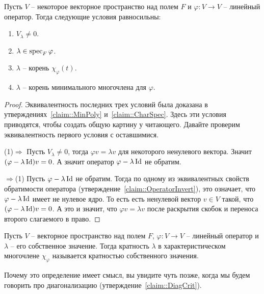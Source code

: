 \begin{claim}
\label{claim::EigenSpec}
Пусть $V$ -- некоторое векторное пространство над полем $F$ и $\varphi \colon V\to V$ -- линейный оператор.
Тогда следующие условия равносильны:
\begin{enumerate}
\item $V_\lambda \neq 0$.

\item $\lambda \in \operatorname{spec}_F\varphi$.

\item $\lambda$ -- корень $\chi_\varphi(t)$.

\item $\lambda$ -- корень минимального многочлена для $\varphi$.
\end{enumerate}
\end{claim}
\begin{proof}
Эквивалентность последних трех условий была доказана в утверждениях~\ref{claim::MinPoly} и~\ref{claim::CharSpec}.
Здесь эти условия приводятся, чтобы создать общую картину у читающего.
Давайте проверим эквивалентность первого условия с оставшимися.

(1)$\Rightarrow$ Пусть $V_\lambda \neq 0$, тогда $\varphi v = \lambda v$ для некоторого ненулевого вектора.
Значит $(\varphi - \lambda \operatorname{Id})v = 0$.
А значит оператор $\varphi - \lambda \operatorname{Id}$ не обратим.

$\Rightarrow$(1) Пусть $\varphi -\lambda \operatorname{Id}$ не обратим.
Тогда по одному из эквивалентных свойств обратимости оператора (утверждение~\ref{claim::OperatorInvert}), это означает, что $\varphi - \lambda \operatorname{Id}$ имеет не нулевое ядро.
То есть есть ненулевой вектор $v\in V$ такой, что $(\varphi - \lambda \operatorname{Id})v = 0$.
А это и значит, что $\varphi v = \lambda v$ после раскрытия скобок и переноса второго слагаемого в право.
\end{proof}

\begin{definition}
Пусть $V$ -- векторное пространство над полем $F$, $\varphi\colon V\to V$ -- линейный оператор и $\lambda$ -- его собственное значение.
Тогда кратность $\lambda$ в характеристическом многочлене $\chi_\varphi$ называется кратностью собственного значения.
\end{definition}

Почему это определение имеет смысл, вы увидите чуть позже, когда мы будем говорить про диагонализацию (утверждение~\ref{claim::DiagCrit}).


